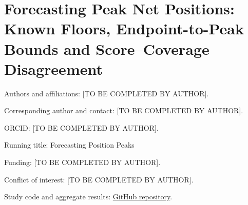\documentclass[11pt,a4paper]{article}
\begin{document}
\section*{Forecasting Peak Net Positions: Known Floors, Endpoint-to-Peak Bounds and Score--Coverage Disagreement}
Authors and affiliations: [TO BE COMPLETED BY AUTHOR].\par\medskip
Corresponding author and contact: [TO BE COMPLETED BY AUTHOR].\par\medskip
ORCID: [TO BE COMPLETED BY AUTHOR].\par\medskip
Running title: Forecasting Position Peaks\par\medskip
Funding: [TO BE COMPLETED BY AUTHOR].\par\medskip
Conflict of interest: [TO BE COMPLETED BY AUTHOR].\par\medskip
Study code and aggregate results: \href{https://github.com/ByronLi0207/financial-mathematics-paper-20261020}{GitHub repository}.\par\medskip
\end{document}
